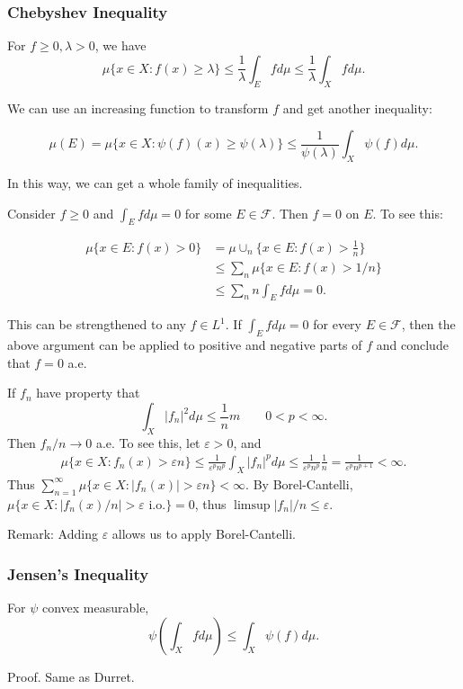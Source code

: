 
\subsubsection{Chebyshev Inequality}


For $f \ge 0, \lambda > 0$, we have 
\[
	\mu \{x \in X: f(x) \ge \lambda\} 
	\le \frac{1}{\lambda} \int_E f d \mu \le \frac{1}{\lambda} \int _X f d \mu
.\] 

We can use an increasing function to transform $f$ and get another inequality:

\[
	\mu(E) = \mu \{x \in X: \psi(f)(x) \ge  \psi(\lambda)\} \le 
	\frac{1}{\psi(\lambda)} \int _X \psi(f) d \mu
.\] 

In this way, we can get a whole family of inequalities.

\begin{example}
	Consider $f \ge 0$ and $\int _E f d \mu = 0$ for some $E \in \mathcal{F}$. Then $f = 0$ on $E$. To see this:

	\begin{align*}
		\mu \{x \in E: f(x) > 0\} 
		&= \mu \cup_n \{x \in E: f(x) > \frac{1}{ n}\} \\
		&\le \sum_n \mu \{x \in E: f(x) > 1 / n\}\\
		&\leq \sum_n n \int _E f d \mu  = 0
	.\end{align*}

	This can be strengthened to any $f \in L^1$. If $\int _E f d \mu = 0$ for every $E \in \mathcal{F}$, then the above argument can be applied to positive and negative parts of  $f$ and conclude that $f = 0$ a.e.
\end{example}

\begin{example}
	If $f_n$ have property that 
	\[
		\int _X |f_n|^2 d \mu \le \frac{1}{n}m\qquad 0 < p< \infty 
	.\] 
	Then $f_n / n \to 0$ a.e. To see this, let $\varepsilon > 0$, and 
	\begin{align*}
		\mu \{x \in X: f_n(x) > \varepsilon n\} \le 
		\frac{1}{\varepsilon^p n^p} \int _X |f_n|^p d \mu 
		\le \frac{1}{\varepsilon^p n^p} \frac{1}{n} = \frac{1}{\varepsilon^p n^{p + 1}} < \infty 
	.\end{align*}
	Thus $\sum_{n = 1}^\infty \mu \{x \in X: |f_n(x)| > \varepsilon n\}  < \infty $. By Borel-Cantelli, $\mu \{x \in X: |f_n(x) / n| > \varepsilon \text{ i.o.}\} = 0 $, thus $\limsup |f_n| / n \le \varepsilon$.

	Remark: Adding $\varepsilon$ allows us to apply Borel-Cantelli.

\end{example}

\subsubsection{Jensen's Inequality}

For $ \psi$ convex measurable,
\[
	\psi \left( \int _X f d \mu \right)  \le  \int _X \psi(f) d \mu
.\] 

Proof. Same as Durret.


